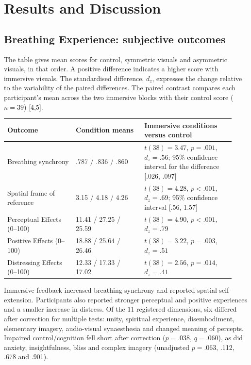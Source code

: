 \section{Results and Discussion}
\label{sec:results}
\subsection{Breathing Experience: subjective outcomes}
\label{sec:subjective-results}
The table gives mean scores for control, symmetric visuals and asymmetric visuals, in that order. A positive difference indicates a higher score with immersive visuals. The standardised difference, $d_z$, expresses the change relative to the variability of the paired differences. The paired contrast compares each participant's mean across the two immersive blocks with their control score ($n=39$) [4,5].

\small
\begin{tabular}{p{0.28\linewidth}p{0.28\linewidth}p{0.37\linewidth}}
\toprule
Outcome & Condition means & Immersive conditions versus control \\
\midrule
Breathing synchrony & .787 / .836 / .860 & $t(38)=3.47$, $p=.001$, $d_z=.56$; 95\% confidence interval for the difference [.026, .097] \\
Spatial frame of reference & 3.15 / 4.18 / 4.26 & $t(38)=4.28$, $p<.001$, $d_z=.69$; 95\% confidence interval [.56, 1.57] \\
Perceptual Effects (0--100) & 11.41 / 27.25 / 25.59 & $t(38)=4.90$, $p<.001$, $d_z=.79$ \\
Positive Effects (0--100) & 18.88 / 25.64 / 26.46 & $t(38)=3.22$, $p=.003$, $d_z=.51$ \\
Distressing Effects (0--100) & 12.33 / 17.33 / 17.02 & $t(38)=2.56$, $p=.014$, $d_z=.41$ \\
\bottomrule
\end{tabular}
\normalsize

Immersive feedback increased breathing synchrony and reported spatial self-extension. Participants also reported stronger perceptual and positive experiences and a smaller increase in distress. Of the 11 registered dimensions, six differed after correction for multiple tests: unity, spiritual experience, disembodiment, elementary imagery, audio-visual synaesthesia and changed meaning of percepts. Impaired control/cognition fell short after correction ($p=.038$, $q=.060$), as did anxiety, insightfulness, bliss and complex imagery (unadjusted $p=.063$, .112, .678 and .901).


